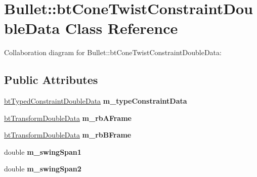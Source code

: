 \hypertarget{class_bullet_1_1bt_cone_twist_constraint_double_data}{\section{Bullet\+:\+:bt\+Cone\+Twist\+Constraint\+Double\+Data Class Reference}
\label{class_bullet_1_1bt_cone_twist_constraint_double_data}
}


Collaboration diagram for Bullet\+:\+:bt\+Cone\+Twist\+Constraint\+Double\+Data\+:
\subsection*{Public Attributes}
\begin{DoxyCompactItemize}
\item 
\hypertarget{class_bullet_1_1bt_cone_twist_constraint_double_data_a195d37d869f2f78c2b75d896b33ab0d6}{\hyperlink{class_bullet_1_1bt_typed_constraint_double_data}{bt\+Typed\+Constraint\+Double\+Data} {\bfseries m\+\_\+type\+Constraint\+Data}}\label{class_bullet_1_1bt_cone_twist_constraint_double_data_a195d37d869f2f78c2b75d896b33ab0d6}

\item 
\hypertarget{class_bullet_1_1bt_cone_twist_constraint_double_data_acb2b226d146441c5398e7e7bcd08dca4}{\hyperlink{class_bullet_1_1bt_transform_double_data}{bt\+Transform\+Double\+Data} {\bfseries m\+\_\+rb\+A\+Frame}}\label{class_bullet_1_1bt_cone_twist_constraint_double_data_acb2b226d146441c5398e7e7bcd08dca4}

\item 
\hypertarget{class_bullet_1_1bt_cone_twist_constraint_double_data_a087a1de271b9b9cf0b336965156f625c}{\hyperlink{class_bullet_1_1bt_transform_double_data}{bt\+Transform\+Double\+Data} {\bfseries m\+\_\+rb\+B\+Frame}}\label{class_bullet_1_1bt_cone_twist_constraint_double_data_a087a1de271b9b9cf0b336965156f625c}

\item 
\hypertarget{class_bullet_1_1bt_cone_twist_constraint_double_data_ac3eab9e43a380c752cfbd2064a926a8b}{double {\bfseries m\+\_\+swing\+Span1}}\label{class_bullet_1_1bt_cone_twist_constraint_double_data_ac3eab9e43a380c752cfbd2064a926a8b}

\item 
\hypertarget{class_bullet_1_1bt_cone_twist_constraint_double_data_a19af20e7456a1bee1163288e39828c38}{double {\bfseries m\+\_\+swing\+Span2}}\label{class_bullet_1_1bt_cone_twist_constraint_double_data_a19af20e7456a1bee1163288e39828c38}


\end{DoxyCompactItemize}
